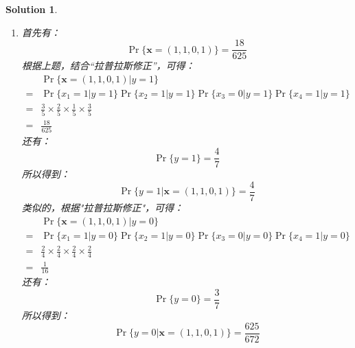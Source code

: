 \documentclass[a4paper,UTF8]{article}
\numberwithin{equation}{section}
\newtheorem*{mySol}{Solution}
\begin{document}
\begin{mySol}
\begin{enumerate}[ {(}1{)}]
\begin{equation}
\Pr\{\mathbf{x}=(1,1,0,1)\} = \frac{18}{625}
\end{equation}
又因为
\begin{equation}
\Pr\{y=0\} = \frac{2}{5}
\end{equation}
综上可得
\begin{equation}
\begin{aligned}
&\Pr\{ y=0 | \mathbf{x}=(1,1,0,1) \}\\ 
=& \frac{\Pr\{\mathbf{x}=(1,1,0,1) | y=0  \} \Pr\{y=0\}}{\Pr\{\mathbf{x}=(1,1,0,1) \}}\\
=& \frac{\frac{1}{16}\times\frac{2}{5}}{\frac{18}{625}}\\ 
=& \frac{125}{144} 
\end{aligned}
\end{equation}

\item 
首先有：
\begin{equation}
\Pr\{\mathbf{x}=(1,1,0,1)\} = \frac{18}{625}
\end{equation}
根据上题，结合“拉普拉斯修正”，可得：
\begin{equation}
\begin{aligned}
&\Pr\{\mathbf{x}=(1,1,0,1) | y=1  \}\\ 
=& \Pr\{x_1 = 1 | y = 1\}\Pr\{x_2 = 1 | y = 1\}\Pr\{x_3 = 0 | y = 1\}\Pr\{x_4 = 1 | y = 1\}\\
=& \frac{3}{5}\times\frac{2}{5}\times\frac{1}{5}\times\frac{3}{5}\\
=& \frac{18}{625}
\end{aligned}
\end{equation}
还有：
\begin{equation}
\Pr\{y=1\} = \frac{4}{7}
\end{equation}
所以得到：
\begin{equation}
\Pr\{ y=1 | \mathbf{x}=(1,1,0,1) \} = \frac{4}{7}
\end{equation}
类似的，根据"拉普拉斯修正"，可得：
\begin{equation}
\begin{aligned}
&\Pr\{\mathbf{x}=(1,1,0,1) | y=0  \}\\ 
=& \Pr\{x_1 = 1 | y = 0\}\Pr\{x_2 = 1 | y = 0\}\Pr\{x_3 = 0 | y = 0\}\Pr\{x_4 = 1 | y = 0\}\\
=& \frac{2}{4}\times\frac{2}{4}\times\frac{2}{4}\times\frac{2}{4}\\
=& \frac{1}{16}
\end{aligned}
\end{equation}
还有：
\begin{equation}
\Pr\{y=0\} = \frac{3}{7}
\end{equation}
所以得到：
\begin{equation}
\Pr\{ y=0 | \mathbf{x}=(1,1,0,1) \} = \frac{625}{672}
\end{equation}
\end{enumerate}	

\end{mySol}
\newpage	
\end{document}
